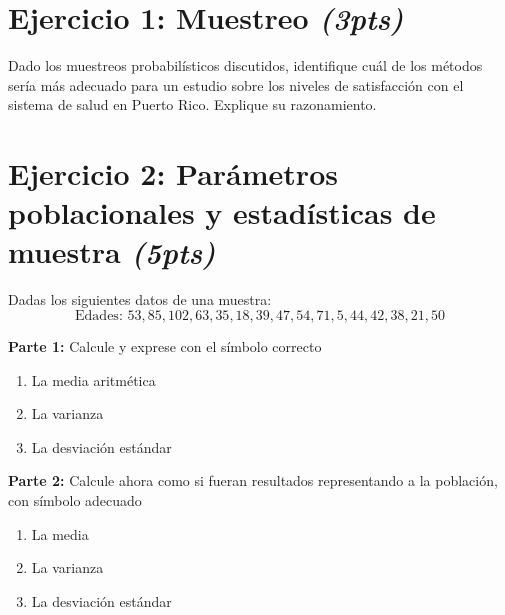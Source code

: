 \documentclass[11pt]{article}
\begin{document}
\begin{enumerate}
\end{enumerate}
\newpage
\section*{Ejercicio 1: Muestreo \textit{(3pts)}} 
Dado los muestreos probabilísticos discutidos, identifique cuál de los métodos sería más adecuado para un estudio sobre los niveles de satisfacción con el sistema de salud en Puerto Rico. Explique su razonamiento.

\vspace{5cm} %

\section*{Ejercicio 2: Parámetros poblacionales y estadísticas de muestra \textit{(5pts)}} 

Dadas los siguientes datos de una muestra:
\[
\text{Edades: } 53, 85, 102, 63, 35, 18, 39, 47, 54, 71, 5, 44, 42, 38, 21,  50
\]

\textbf{Parte 1:} Calcule y exprese con el símbolo correcto 
\begin{enumerate}
    \item La media aritmética
    \item La varianza
    \item La desviación estándar
\end{enumerate}
\vspace{3cm} %
\textbf{Parte 2:} Calcule ahora como si fueran resultados representando a la población, con símbolo adecuado
\begin{enumerate}
    \item[4.] La media
    \item[5.] La varianza
    \item[6.] La desviación estándar
\end{enumerate}
\vspace{3cm} %
\end{document}
